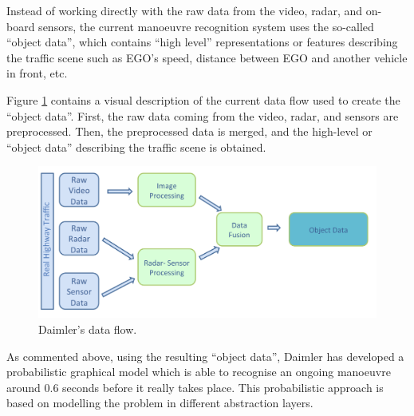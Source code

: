 Instead of working directly with the raw data from the video, radar, and on-board sensors, the current manoeuvre recognition system uses the so-called ``object data'', which contains ``high level'' representations or features describing the traffic scene such as EGO's speed, distance between EGO and another vehicle in front, etc.  

Figure \ref{Figure:DaimlerDataFlow} contains a visual description of the current data flow used to create the ``object data''.  First, the raw data coming from the video, radar, and sensors are preprocessed. Then, the preprocessed data is merged, and the high-level or ``object data'' describing the traffic scene is obtained. 

\begin{figure}[ht!]
\begin{center}
\includegraphics[scale=0.35]{./figures/DaimlerDataFlow}
\caption{\label{Figure:DaimlerDataFlow} Daimler's data flow.}
\end{center}
\end{figure}

As commented above, using the resulting ``object data'', Daimler has developed a probabilistic graphical model \cite{kasper2012object} which is able to recognise an ongoing manoeuvre around 0.6 seconds before it really takes place.  This probabilistic approach is based on modelling the problem in different abstraction layers. 

%
%
%

